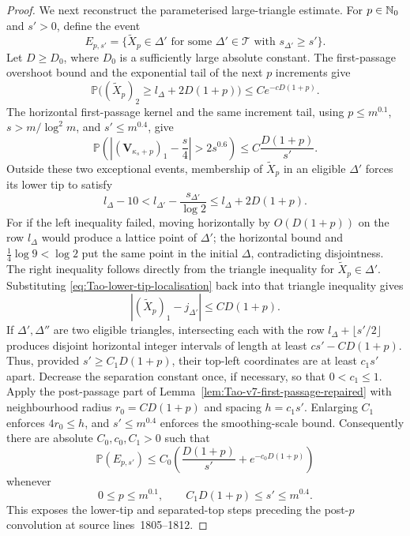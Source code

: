 \begin{proof}
We next reconstruct the parameterised large-triangle estimate.  For
\(p\in\mathbb{N}_{0}\) and \(s'>0\), define the event
\[
 E_{p,s'}=\{\widetilde X_p\in\Delta'
   \text{ for some }\Delta'\in\mathcal T
   \text{ with }s_{\Delta'}\ge s'\}.
\]
Let \(D\ge D_0\), where \(D_0\) is a sufficiently large absolute constant.
The first-passage overshoot bound and the exponential tail of the next
\(p\) increments give
\[
 \mathbb P\bigl((\widetilde X_p)_2
     \ge l_\Delta+2D(1+p)\bigr)
 \le C e^{-cD(1+p)}.
\]
The horizontal first-passage kernel and the same increment tail, using
\(p\le m^{0.1}\), \(s>m/\log^2m\), and \(s'\le m^{0.4}\), give
\[
 \mathbb P\left(
 \left|(\mathbf V_{\kappa_s+p})_1-\frac s4\right|>2s^{0.6}
 \right)
 \le C\frac{D(1+p)}{s'}.
\]
Outside these two exceptional events, membership of \(\widetilde X_p\) in
an eligible \(\Delta'\) forces its lower tip to satisfy
\begin{equation}
\label{eq:Tao-lower-tip-localisation}
 l_\Delta-10<l_{\Delta'}-\frac{s_{\Delta'}}{\log2}
 \le l_\Delta+2D(1+p).
\end{equation}
For if the left inequality failed, moving horizontally by
\(O(D(1+p))\) on the row \(l_\Delta\) would produce a lattice point of
\(\Delta'\); the horizontal bound and
\(\frac14\log9<\log2\) put the same point in the initial \(\Delta\),
contradicting disjointness.  The right inequality follows directly from
the triangle inequality for \(\widetilde X_p\in\Delta'\).  Substituting
\eqref{eq:Tao-lower-tip-localisation} back into that triangle inequality
gives
\[
 |(\widetilde X_p)_1-j_{\Delta'}|\le C D(1+p).
\]
If \(\Delta',\Delta''\) are two eligible triangles, intersecting each with
the row \(l_\Delta+\lfloor s'/2\rfloor\) produces disjoint horizontal
integer intervals of length at least
\(c s'-CD(1+p)\).  Thus, provided
\(s'\ge C_1D(1+p)\), their top-left coordinates are at least \(c_1s'\)
apart.  Decrease the separation constant once, if necessary, so that
\(0<c_1\le1\).  Apply the post-passage part of
Lemma~\ref{lem:Tao-v7-first-passage-repaired} with neighbourhood radius
\(r_0=CD(1+p)\) and spacing \(h=c_1s'\).  Enlarging \(C_1\) enforces
\(4r_0\le h\), and \(s'\le m^{0.4}\) enforces the smoothing-scale bound.
Consequently there are absolute \(C_0,c_0,C_1>0\) such that
\begin{equation}
\label{eq:Tao-large-triangle-parametric}
 \mathbb P(E_{p,s'})\le C_0\left(
 \frac{D(1+p)}{s'}+e^{-c_0D(1+p)}\right)
\end{equation}
whenever
\[
 0\le p\le m^{0.1},\qquad
 C_1D(1+p)\le s'\le m^{0.4}.
\]
This exposes the lower-tip and separated-top steps preceding the
post-\(p\) convolution at source lines~1805--1812.


\end{proof}
